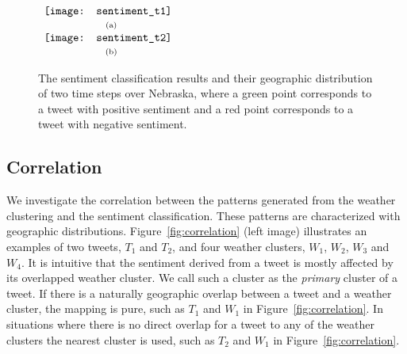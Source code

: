 \begin{figure}[t]
\begin{center}
$\begin{array}{c}
\texttt{[image: sentiment\_t1]} \\
\mbox{\small{(a)}} \\
\texttt{[image: sentiment\_t2]} \\
\mbox{\small{(b)}}
\end{array}$
\end{center}
\vspace{-.1in}
\caption{The sentiment classification results and their geographic distribution of two time steps over Nebraska, where a green point corresponds to a tweet with positive sentiment and a red point corresponds to a tweet with negative sentiment.}
\label{fig:sentiment}
\end{figure}


\subsection{Correlation}
\label{sec:corr}

We investigate the correlation between the patterns generated from the weather clustering and the sentiment classification. These patterns are characterized with geographic distributions. Figure~\ref{fig:correlation} (left image) illustrates an examples of two tweets, $T_1$ and $T_2$, and four weather clusters, $W_1$, $W_2$, $W_3$ and $W_4$. It is intuitive that the sentiment derived from a tweet is mostly affected by its overlapped weather cluster. We call such a cluster as the \emph{primary} cluster of a tweet. If there is a naturally geographic overlap between a tweet and a weather cluster, the mapping is pure, such as $T_1$ and $W_1$ in Figure~\ref{fig:correlation}. In situations where there is no direct overlap for a tweet to any of the weather clusters the nearest cluster is used, such as $T_2$ and $W_1$ in Figure~\ref{fig:correlation}.


